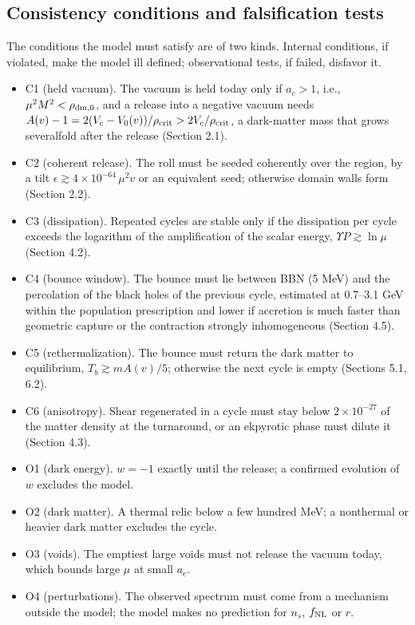 \documentclass[11pt,a4paper]{article}
\begin{document}
\subsection{Consistency conditions and falsification tests}
The conditions the model must satisfy are of two kinds. Internal conditions, if violated, make the model ill defined; observational tests, if failed, disfavor it.

\begin{itemize}\item C1 (held vacuum). The vacuum is held today only if $a_c>1$, i.e., $\mu^2M^2<\rho_{\rm dm,0}$, and a release into a negative vacuum needs $A(v)-1=2(V_c-V_0(v))/\rho_{\rm crit}>2V_c/\rho_{\rm crit}$, a dark-matter mass that grows severalfold after the release (Section 2.1).
\item C2 (coherent release). The roll must be seeded coherently over the region, by a tilt $\epsilon\gtrsim4\times10^{-64}\,\mu^2v$ or an equivalent seed; otherwise domain walls form (Section 2.2).
\item C3 (dissipation). Repeated cycles are stable only if the dissipation per cycle exceeds the logarithm of the amplification of the scalar energy, $\Upsilon P\gtrsim\ln\mu$ (Section 4.2).
\item C4 (bounce window). The bounce must lie between BBN (5 MeV) and the percolation of the black holes of the previous cycle, estimated at 0.7--3.1 GeV within the population prescription and lower if accretion is much faster than geometric capture or the contraction strongly inhomogeneous (Section 4.5).
\item C5 (rethermalization). The bounce must return the dark matter to equilibrium, $T_b\gtrsim mA(v)/5$; otherwise the next cycle is empty (Sections 5.1, 6.2).
\item C6 (anisotropy). Shear regenerated in a cycle must stay below $2\times10^{-27}$ of the matter density at the turnaround, or an ekpyrotic phase must dilute it (Section 4.3).
\item O1 (dark energy). $w=-1$ exactly until the release; a confirmed evolution of $w$ excludes the model.
\item O2 (dark matter). A thermal relic below a few hundred MeV; a nonthermal or heavier dark matter excludes the cycle.
\item O3 (voids). The emptiest large voids must not release the vacuum today, which bounds large $\mu$ at small $a_c$.
\item O4 (perturbations). The observed spectrum must come from a mechanism outside the model; the model makes no prediction for $n_s$, $f_{\rm NL}$ or $r$.
\end{itemize}
\end{document}
